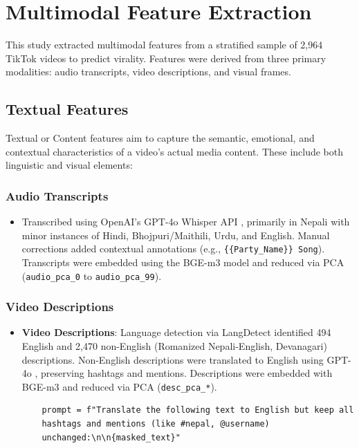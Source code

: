 \documentclass[12pt,a4paper]{report}
\begin{document}
\section{Multimodal Feature Extraction}

This study extracted multimodal features from a stratified sample of 2,964 TikTok videos to predict virality. Features were derived from three primary modalities: audio transcripts, video descriptions, and visual frames.

\subsection{Textual Features}
Textual or Content features aim to capture the semantic, emotional, and contextual characteristics of a video’s actual media content. These include both linguistic and visual elements:

\subsubsection{Audio Transcripts}

\begin{itemize}
    \item Transcribed using OpenAI’s GPT-4o Whisper API \parencite{OpenAI2024gpt4o}, primarily in Nepali with minor instances of Hindi, Bhojpuri/Maithili, Urdu, and English. Manual corrections added contextual annotations (e.g., \texttt{\{\{Party\_Name\}\} Song}). Transcripts were embedded using the BGE-m3 model \parencite{bge-m3} and reduced via PCA (\texttt{audio\_pca\_0} to \texttt{audio\_pca\_99}).
\end{itemize}

\subsubsection{Video Descriptions}

\begin{itemize}
    \item \textbf{Video Descriptions}: Language detection via LangDetect \parencite{langdetect} identified 494 English and 2,470 non-English (Romanized Nepali-English, Devanagari) descriptions. Non-English descriptions were translated to English using GPT-4o \parencite{OpenAI2024gpt4o}, preserving hashtags and mentions. Descriptions were embedded with BGE-m3 and reduced via PCA (\texttt{desc\_pca\_*}).

    \begin{verbatim}
    prompt = f"Translate the following text to English but keep all 
    hashtags and mentions (like #nepal, @username) 
    unchanged:\n\n{masked_text}"
    \end{verbatim}
\end{itemize}
\end{document}
